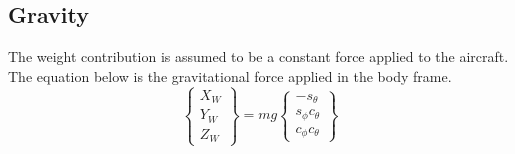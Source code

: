 \documentclass{article}
\begin{document}
\subsection{Gravity}
The weight contribution is assumed to be a constant force applied to
the aircraft. The equation below is the gravitational force applied in
the body frame.
\begin{equation}\label{e:wforce}
\begin{Bmatrix} X_W \\ Y_W \\ Z_W \end{Bmatrix} = mg \begin{Bmatrix}
-s_{\theta} \\ s_{\phi}c_{\theta} \\ c_{\phi}c_{\theta} \end{Bmatrix}
\end{equation}
\end{document}
